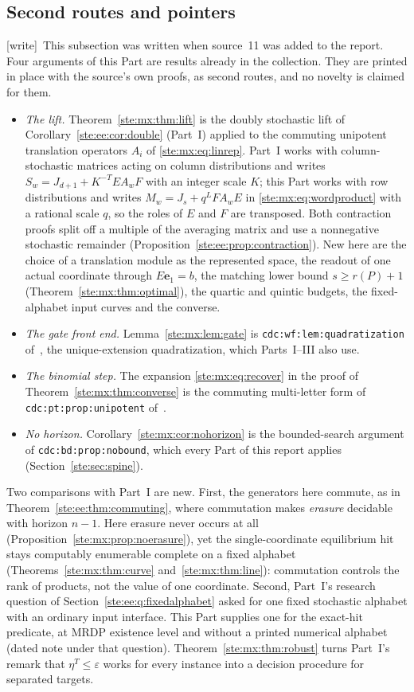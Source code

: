\documentclass[11pt,letterpaper]{article}
\theoremstyle{definition}
\theoremstyle{remark}
\newcommand{\e}{\mathbf e}
\newcommand{\wtag}{\textup{[write]}}
\begin{document}
\subsection{Second routes and pointers}\label{ste:mx:sec:pointers}

\wtag\ This subsection was written when source~11 was added to the report. Four arguments of this Part are results already in the collection. They are printed in place with the source's own proofs, as second routes, and no novelty is claimed for them.
\begin{itemize}
\item \emph{The lift.} Theorem~\ref{ste:mx:thm:lift} is the doubly stochastic lift of Corollary~\ref{ste:ee:cor:double} (Part~I) applied to the commuting unipotent translation operators $A_i$ of \eqref{ste:mx:eq:linrep}. Part~I works with column-stochastic matrices acting on column distributions and writes $S_w=J_{d+1}+K^{-T}EA_wF$ with an integer scale $K$; this Part works with row distributions and writes $M_w=J_s+q^LFA_wE$ in \eqref{ste:mx:eq:wordproduct} with a rational scale $q$, so the roles of $E$ and $F$ are transposed. Both contraction proofs split off a multiple of the averaging matrix and use a nonnegative stochastic remainder (Proposition~\ref{ste:ee:prop:contraction}). New here are the choice of a translation module as the represented space, the readout of one actual coordinate through $E\e_1=b$, the matching lower bound $s\geq r(P)+1$ (Theorem~\ref{ste:mx:thm:optimal}), the quartic and quintic budgets, the fixed-alphabet input curves and the converse.
\item \emph{The gate front end.} Lemma~\ref{ste:mx:lem:gate} is \texttt{cdc:wf:lem:quadratization} of~\cite{cdc}, the unique-extension quadratization, which Parts~I--III also use.
\item \emph{The binomial step.} The expansion \eqref{ste:mx:eq:recover} in the proof of Theorem~\ref{ste:mx:thm:converse} is the commuting multi-letter form of \texttt{cdc:pt:prop:unipotent} of~\cite{cdc}.
\item \emph{No horizon.} Corollary~\ref{ste:mx:cor:nohorizon} is the bounded-search argument of \texttt{cdc:bd:prop:nobound}, which every Part of this report applies (Section~\ref{ste:sec:spine}).
\end{itemize}
Two comparisons with Part~I are new. First, the generators here commute, as in Theorem~\ref{ste:ee:thm:commuting}, where commutation makes \emph{erasure} decidable with horizon $n-1$. Here erasure never occurs at all (Proposition~\ref{ste:mx:prop:noerasure}), yet the single-coordinate equilibrium hit stays computably enumerable complete on a fixed alphabet (Theorems~\ref{ste:mx:thm:curve} and~\ref{ste:mx:thm:line}): commutation controls the rank of products, not the value of one coordinate. Second, Part~I's research question of Section~\ref{ste:ee:q:fixedalphabet} asked for one fixed stochastic alphabet with an ordinary input interface. This Part supplies one for the exact-hit predicate, at MRDP existence level and without a printed numerical alphabet (dated note under that question). Theorem~\ref{ste:mx:thm:robust} turns Part~I's remark that $\eta^T\leq\varepsilon$ works for every instance into a decision procedure for separated targets.
\end{document}
